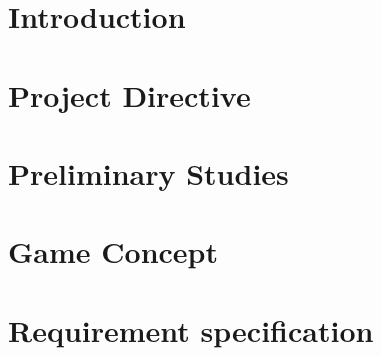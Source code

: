 \documentclass[11pt, a4paper]{article}
\begin{document}

%

\newpage

\newpage
\tableofcontents
\newpage
{}

\listoffigures

\clearpage

\listoftables

\clearpage

\section{Introduction}


\clearpage


\clearpage
\section{Project Directive}

\clearpage

\clearpage

\clearpage

\clearpage

\clearpage


\clearpage
\section{Preliminary Studies}


\clearpage

\clearpage

\clearpage

\clearpage


\clearpage
\section{Game Concept}



\clearpage
\section{Requirement specification}


\clearpage

\clearpage

\clearpage

\clearpage

\end{document}
